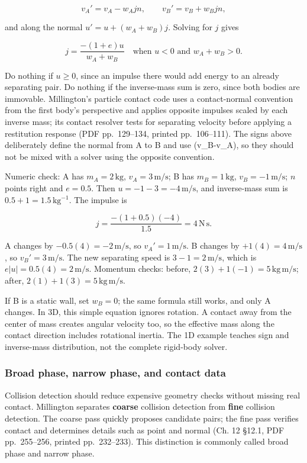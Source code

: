 \[
v_A'=v_A-w_A j n,\qquad v_B'=v_B+w_B j n,
\]

and along the normal \(u'=u+(w_A+w_B)j\). Solving for \(j\) gives

\[
j=\frac{-(1+e)u}{w_A+w_B}\quad\text{when }u<0\text{ and }w_A+w_B>0.
\]

Do nothing if \(u\ge0\), since an impulse there would add energy to an already separating pair. Do nothing if the inverse-mass sum is zero, since both bodies are immovable. Millington's particle contact code uses a contact-normal convention from the first body's perspective and applies opposite impulses scaled by each inverse mass; its contact resolver tests for separating velocity before applying a restitution response (PDF pp.~129--134, printed pp.~106--111). The signs above deliberately define the normal from A to B and use (v\_B-v\_A), so they should not be mixed with a solver using the opposite convention.

Numeric check: A has \(m_A=2\,\mathrm{kg}\), \(v_A=3\,\mathrm{m/s}\); B has \(m_B=1\,\mathrm{kg}\), \(v_B=-1\,\mathrm{m/s}\); \(n\) points right and \(e=0.5\). Then \(u=-1-3=-4\,\mathrm{m/s}\), and inverse-mass sum is \(0.5+1=1.5\,\mathrm{kg^{-1}}\). The impulse is

\[
j=\frac{-(1+0.5)(-4)}{1.5}=4\,\mathrm{N\,s}.
\]

A changes by \(-0.5(4)=-2\,\mathrm{m/s}\), so \(v_A'=1\,\mathrm{m/s}\). B changes by \(+1(4)=4\,\mathrm{m/s}\), so \(v_B'=3\,\mathrm{m/s}\). The new separating speed is \(3-1=2\,\mathrm{m/s}\), which is \(e|u|=0.5(4)=2\,\mathrm{m/s}\). Momentum checks: before, \(2(3)+1(-1)=5\,\mathrm{kg\,m/s}\); after, \(2(1)+1(3)=5\,\mathrm{kg\,m/s}\).

If B is a static wall, set \(w_B=0\); the same formula still works, and only A changes. In 3D, this simple equation ignores rotation. A contact away from the center of mass creates angular velocity too, so the effective mass along the contact direction includes rotational inertia. The 1D example teaches sign and inverse-mass distribution, not the complete rigid-body solver.

\subsubsection{Broad phase, narrow phase, and contact data}\label{broad-phase-narrow-phase-and-contact-data}

Collision detection should reduce expensive geometry checks without missing real contact. Millington separates \textbf{coarse} collision detection from \textbf{fine} collision detection. The coarse pass quickly proposes candidate pairs; the fine pass verifies contact and determines details such as point and normal (Ch. 12 §12.1, PDF pp.~255--256, printed pp.~232--233). This distinction is commonly called broad phase and narrow phase.


